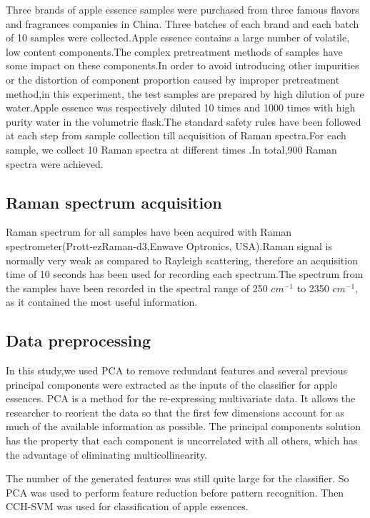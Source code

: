 \documentclass[a4paper]{article}
\begin{document}
Three brands of apple essence samples were purchased from three famous flavors and fragrances companies in China. Three batches of each brand and  each batch of 10 samples were collected.Apple essence contains a large number of volatile, low content components.The complex pretreatment methods of samples have some impact on these components.In order to avoid introducing other impurities or the distortion of component proportion caused by improper pretreatment method,in this experiment, the test samples are prepared by high dilution of pure water.Apple essence was respectively diluted 10 times and 1000 times with high purity water in the volumetric flask.The  standard  safety  rules  have  been  followed  at  each step from sample collection till acquisition of Raman spectra.For each sample, we collect 10 Raman spectra at different times .In total,900 Raman spectra were achieved.


\subsection{Raman spectrum acquisition}%
Raman spectrum for all samples have been acquired with Raman spectrometer(Prott-ezRaman-d3,Enwave Optronics, USA).Raman  signal  is  normally  very  weak  as  compared  to  Rayleigh  scattering,  therefore  an acquisition time of 10 seconds has been used for recording each spectrum.The spectrum from the  samples  have  been  recorded  in  the  spectral  range  of  250 $cm^{−1}$  to  2350 $cm^{−1}$,  as  it contained the most useful information.

\subsection{Data preprocessing}%
In this study,we used PCA to remove redundant features and several previous principal components were extracted as the inputs of the classifier for apple essences.
PCA is  a  method  for  the  re-expressing  multivariate  data.   It  allows  the researcher to reorient the data so that the first few dimensions account for as much  of  the  available  information  as  possible.  The  principal  components solution has the property that each component is uncorrelated with all others, which  has  the  advantage  of  eliminating  multicollinearity.

The number of the generated features was still quite large for  the  classifier.  So  PCA  was  used  to  perform  feature reduction  before  pattern  recognition.  Then  CCH-SVM  was  used  for  classification  of  apple essences.
\end{document}
